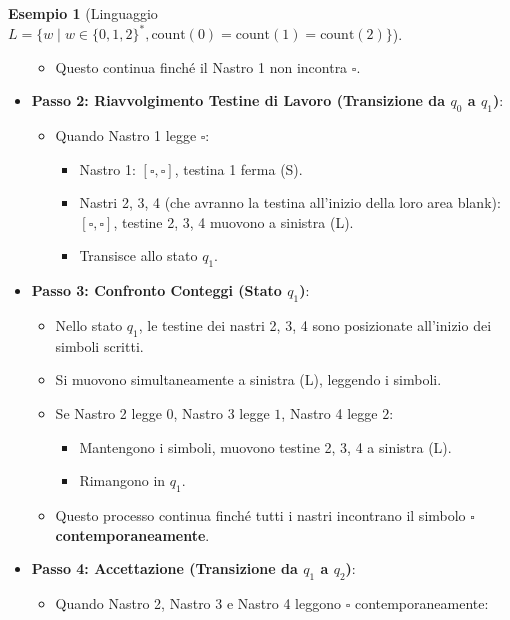 \documentclass[a4paper]{article}
\theoremstyle{definition} %
\newtheorem{example}{Esempio}
\newcommand{\blankS}{\ensuremath{\square}}
\begin{document}
\begin{example}[Linguaggio $L = \{w \mid w \in \{0,1,2\}^*, \text{count}(0)=\text{count}(1)=\text{count}(2)\}$]
\begin{itemize}
\begin{itemize}
            \item Questo continua finché il Nastro 1 non incontra $\blankS$.
        \end{itemize}
    \item \textbf{Passo 2: Riavvolgimento Testine di Lavoro (Transizione da $q_0$ a $q_1$)}:
        \begin{itemize}
            \item Quando Nastro 1 legge $\blankS$:
                \begin{itemize}
                    \item Nastro 1: $[\blankS, \blankS]$, testina 1 ferma (S).
                    \item Nastri 2, 3, 4 (che avranno la testina all'inizio della loro area blank): $[\blankS, \blankS]$, testine 2, 3, 4 muovono a sinistra (L).
                    \item Transisce allo stato $q_1$.
                \end{itemize}
        \end{itemize}
    \item \textbf{Passo 3: Confronto Conteggi (Stato $q_1$)}:
        \begin{itemize}
            \item Nello stato $q_1$, le testine dei nastri 2, 3, 4 sono posizionate all'inizio dei simboli scritti.
            \item Si muovono simultaneamente a sinistra (L), leggendo i simboli.
            \item Se Nastro 2 legge $0$, Nastro 3 legge $1$, Nastro 4 legge $2$:
                \begin{itemize}
                    \item Mantengono i simboli, muovono testine 2, 3, 4 a sinistra (L).
                    \item Rimangono in $q_1$.
                \end{itemize}
            \item Questo processo continua finché tutti i nastri incontrano il simbolo $\blankS$ \textbf{contemporaneamente}.
        \end{itemize}
    \item \textbf{Passo 4: Accettazione (Transizione da $q_1$ a $q_2$)}:
        \begin{itemize}
            \item Quando Nastro 2, Nastro 3 e Nastro 4 leggono $\blankS$ contemporaneamente:
                \begin{itemize}

\end{itemize}
\end{itemize}
\end{itemize}
\end{example}
\end{document}
